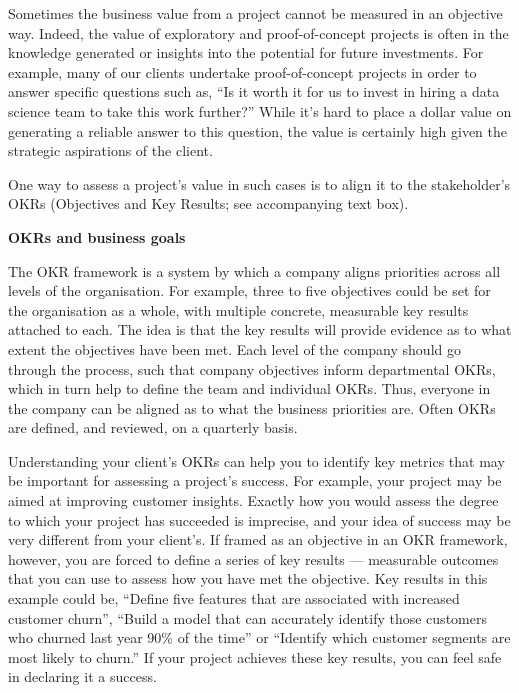 \documentclass[
]{book}
\begin{document}
Sometimes the business value from a project cannot be measured in an
objective way. Indeed, the value of exploratory and proof-of-concept
projects is often in the knowledge generated or insights into the
potential for future investments. For example, many of our clients
undertake proof-of-concept projects in order to answer specific
questions such as, ``Is it worth it for us to invest in hiring a data
science team to take this work further?'' While it's hard to place a
dollar value on generating a reliable answer to this question, the value
is certainly high given the strategic aspirations of the client.

One way to assess a project's value in such cases is to align it to the
stakeholder's OKRs (Objectives and Key Results; see accompanying text
box).

\begin{infobox}

\textbf{OKRs and business goals}

The OKR framework is a system by which a company aligns priorities
across all levels of the organisation. For example, three to five
objectives could be set for the organisation as a whole, with multiple
concrete, measurable key results attached to each. The idea is that the
key results will provide evidence as to what extent the objectives have
been met. Each level of the company should go through the process, such
that company objectives inform departmental OKRs, which in turn help to
define the team and individual OKRs. Thus, everyone in the company can
be aligned as to what the business priorities are. Often OKRs are
defined, and reviewed, on a quarterly basis.

\end{infobox}

Understanding your client's OKRs can help you to identify key metrics
that may be important for assessing a project's success. For example,
your project may be aimed at improving customer insights. Exactly how
you would assess the degree to which your project has succeeded is
imprecise, and your idea of success may be very different from your
client's. If framed as an objective in an OKR framework, however, you
are forced to define a series of key results --- measurable outcomes
that you can use to assess how you have met the objective. Key results
in this example could be, ``Define five features that are associated
with increased customer churn'', ``Build a model that can accurately
identify those customers who churned last year 90\% of the time'' or
``Identify which customer segments are most likely to churn.'' If your
project achieves these key results, you can feel safe in declaring it a
success.
\end{document}

